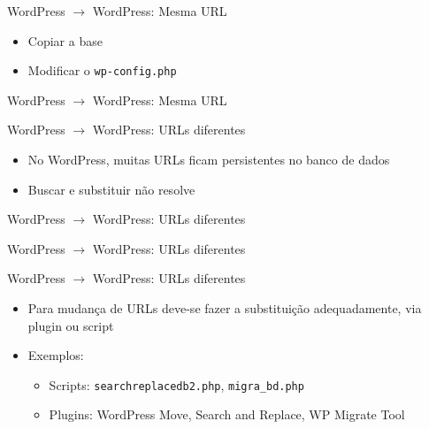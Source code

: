 \documentclass[handout]{beamer}
\begin{document}
\begin{frame}{WordPress $\rightarrow$ WordPress: Mesma URL}
\begin{itemize}
  \pause \item Copiar a base
  \pause \item Modificar o \texttt{wp-config.php}
\end{itemize}
\end{frame}

\begin{frame}[fragile]{WordPress $\rightarrow$ WordPress: Mesma URL}
  
\end{frame}

\begin{frame}{WordPress $\rightarrow$ WordPress: URLs diferentes}
\begin{itemize}
  \pause \item No WordPress, muitas URLs ficam persistentes no banco de dados
  \pause \item Buscar e substituir não resolve
\end{itemize}
\end{frame}

\begin{frame}[fragile]{WordPress $\rightarrow$ WordPress: URLs diferentes}
  
  \pause
  
\end{frame}

\begin{frame}[fragile]{WordPress $\rightarrow$ WordPress: URLs diferentes}
  
  \pause
  
  \pause
  
\end{frame}

\begin{frame}{WordPress $\rightarrow$ WordPress: URLs diferentes}
\begin{itemize}
  \item Para mudança de URLs deve-se fazer a substituição
        adequadamente, via plugin ou script
  \pause \item Exemplos:
  \begin{itemize}
    \item Scripts: \texttt{searchreplacedb2.php}, \texttt{migra\_bd.php}
    \item Plugins: WordPress Move, Search and Replace, WP Migrate Tool
  \end{itemize}
\end{itemize}
\end{frame}
\end{document}
